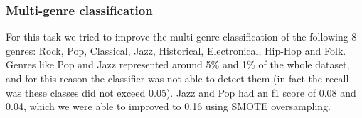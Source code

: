 \subsubsection{Multi-genre classification}
For this task we tried to improve the multi-genre classification of the following 8 genres: Rock, Pop, Classical, Jazz, Historical, Electronical, Hip-Hop and Folk. Genres like Pop and Jazz represented around 5\% and 1\% of the whole dataset, and for this reason the classifier was not able to detect them (in fact the recall was these classes did not exceed 0.05). Jazz and Pop had an f1 score of 0.08 and 0.04, which we were able to improved to 0.16 using SMOTE oversampling.